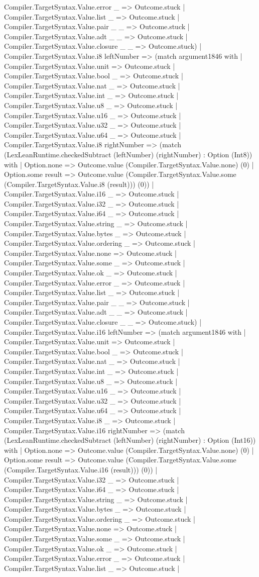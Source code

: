 \documentclass[11pt]{article}
\begin{document}
Compiler.TargetSyntax.Value.error \_ => Outcome.stuck | Compiler.TargetSyntax.Value.list \_ => Outcome.stuck | Compiler.TargetSyntax.Value.pair \_ \_ => Outcome.stuck | Compiler.TargetSyntax.Value.adt \_ \_ => Outcome.stuck | Compiler.TargetSyntax.Value.closure \_ \_ => Outcome.stuck) | Compiler.TargetSyntax.Value.i8 leftNumber => (match argument1846 with | Compiler.TargetSyntax.Value.unit => Outcome.stuck | Compiler.TargetSyntax.Value.bool \_ => Outcome.stuck | Compiler.TargetSyntax.Value.nat \_ => Outcome.stuck | Compiler.TargetSyntax.Value.int \_ => Outcome.stuck | Compiler.TargetSyntax.Value.u8 \_ => Outcome.stuck | Compiler.TargetSyntax.Value.u16 \_ => Outcome.stuck | Compiler.TargetSyntax.Value.u32 \_ => Outcome.stuck | Compiler.TargetSyntax.Value.u64 \_ => Outcome.stuck | Compiler.TargetSyntax.Value.i8 rightNumber => (match (LexLeanRuntime.checkedSubtract (leftNumber) (rightNumber) : Option (Int8)) with | Option.none => Outcome.value (Compiler.TargetSyntax.Value.none) (0) | Option.some result => Outcome.value (Compiler.TargetSyntax.Value.some (Compiler.TargetSyntax.Value.i8 (result))) (0)) | Compiler.TargetSyntax.Value.i16 \_ => Outcome.stuck | Compiler.TargetSyntax.Value.i32 \_ => Outcome.stuck | Compiler.TargetSyntax.Value.i64 \_ => Outcome.stuck | Compiler.TargetSyntax.Value.string \_ => Outcome.stuck | Compiler.TargetSyntax.Value.bytes \_ => Outcome.stuck | Compiler.TargetSyntax.Value.ordering \_ => Outcome.stuck | Compiler.TargetSyntax.Value.none => Outcome.stuck | Compiler.TargetSyntax.Value.some \_ => Outcome.stuck | Compiler.TargetSyntax.Value.ok \_ => Outcome.stuck | Compiler.TargetSyntax.Value.error \_ => Outcome.stuck | Compiler.TargetSyntax.Value.list \_ => Outcome.stuck | Compiler.TargetSyntax.Value.pair \_ \_ => Outcome.stuck | Compiler.TargetSyntax.Value.adt \_ \_ => Outcome.stuck | Compiler.TargetSyntax.Value.closure \_ \_ => Outcome.stuck) | Compiler.TargetSyntax.Value.i16 leftNumber => (match argument1846 with | Compiler.TargetSyntax.Value.unit => Outcome.stuck | Compiler.TargetSyntax.Value.bool \_ => Outcome.stuck | Compiler.TargetSyntax.Value.nat \_ => Outcome.stuck | Compiler.TargetSyntax.Value.int \_ => Outcome.stuck | Compiler.TargetSyntax.Value.u8 \_ => Outcome.stuck | Compiler.TargetSyntax.Value.u16 \_ => Outcome.stuck | Compiler.TargetSyntax.Value.u32 \_ => Outcome.stuck | Compiler.TargetSyntax.Value.u64 \_ => Outcome.stuck | Compiler.TargetSyntax.Value.i8 \_ => Outcome.stuck | Compiler.TargetSyntax.Value.i16 rightNumber => (match (LexLeanRuntime.checkedSubtract (leftNumber) (rightNumber) : Option (Int16)) with | Option.none => Outcome.value (Compiler.TargetSyntax.Value.none) (0) | Option.some result => Outcome.value (Compiler.TargetSyntax.Value.some (Compiler.TargetSyntax.Value.i16 (result))) (0)) | Compiler.TargetSyntax.Value.i32 \_ => Outcome.stuck | Compiler.TargetSyntax.Value.i64 \_ => Outcome.stuck | Compiler.TargetSyntax.Value.string \_ => Outcome.stuck | Compiler.TargetSyntax.Value.bytes \_ => Outcome.stuck | Compiler.TargetSyntax.Value.ordering \_ => Outcome.stuck | Compiler.TargetSyntax.Value.none => Outcome.stuck | Compiler.TargetSyntax.Value.some \_ => Outcome.stuck | Compiler.TargetSyntax.Value.ok \_ => Outcome.stuck | Compiler.TargetSyntax.Value.error \_ => Outcome.stuck | Compiler.TargetSyntax.Value.list \_ => Outcome.stuck | 
\end{document}
